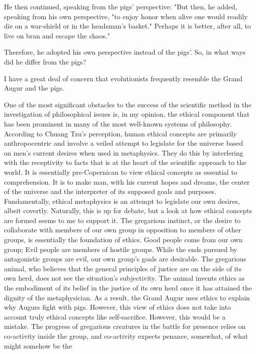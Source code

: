 \documentclass[a4paper,12pt]{book}[2004/02/16]
\theoremstyle{ilemma}
\theoremstyle{itheorem}
\theoremstyle{iother}
\theoremstyle{icorollary}
\theoremstyle{numcorollary}
\theoremstyle{idefinition}
\begin{document}
  He then continued, speaking from the pigs' perspective: "But then, he added, speaking from his own perspective, "to enjoy honor when alive one would readily die on a war-shield or in the headsman's basket." Perhaps it is better, after all, to live on bran and escape the chaos."

  Therefore, he adopted his own perspective instead of the pigs'. So, in what ways did he differ from the pigs?

I have a great deal of concern that evolutionists frequently resemble the Grand Augur and the pigs.

One of the most significant obstacles to the success of the scientific method in the investigation of philosophical issues is, in my opinion, the ethical component that has been prominent in many of the most well-known systems of philosophy. According to Chuang Tzu's perception, human ethical concepts are primarily anthropocentric and involve a veiled attempt to legislate for the universe based on men's current desires when used in metaphysics. They do this by interfering with the receptivity to facts that is at the heart of the scientific approach to the world. It is essentially pre-Copernican to view ethical concepts as essential to comprehension. It is to make man, with his current hopes and dreams, the center of the universe and the interpreter of its supposed goals and purposes. Fundamentally, ethical metaphysics is an attempt to legislate our own desires, albeit covertly. Naturally, this is up for debate, but a look at how ethical concepts are formed seems to me to support it. The gregarious instinct, or the desire to collaborate with members of our own group in opposition to members of other groups, is essentially the foundation of ethics. Good people come from our own group; Evil people are members of hostile groups. While the ends pursued by antagonistic groups are evil, our own group's goals are desirable. The gregarious animal, who believes that the general principles of justice are on the side of its own herd, does not see the situation's subjectivity. The animal invents ethics as the embodiment of its belief in the justice of its own herd once it has attained the dignity of the metaphysician. As a result, the Grand Augur uses ethics to explain why Augurs fight with pigs.
However, this view of ethics does not take into account truly ethical concepts like self-sacrifice. However, this would be a mistake. The progress of gregarious creatures in the battle for
presence relies on co-activity inside the group, and co-activity
expects penance, somewhat, of what might somehow be the
\end{document}
